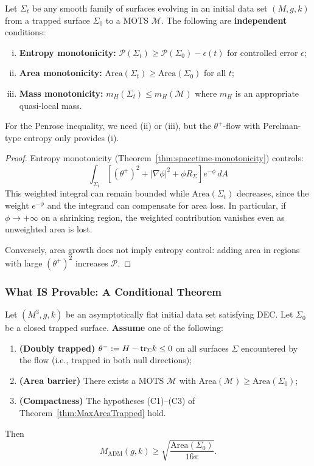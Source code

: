 \begin{proposition}
\label{prop:fundamental-gap}
Let $\Sigma_t$ be any smooth family of surfaces evolving in an initial data set $(M,g,k)$ from a trapped surface $\Sigma_0$ to a MOTS $\mathcal{M}$. The following are \textbf{independent} conditions:
\begin{enumerate}[(i)]
\item \textbf{Entropy monotonicity:} $\mathcal{P}(\Sigma_t) \geq \mathcal{P}(\Sigma_0) - \epsilon(t)$ for controlled error $\epsilon$;
\item \textbf{Area monotonicity:} $\mathrm{Area}(\Sigma_t) \geq \mathrm{Area}(\Sigma_0)$ for all $t$;
\item \textbf{Mass monotonicity:} $m_H(\Sigma_t) \leq m_H(\mathcal{M})$ where $m_H$ is an appropriate quasi-local mass.
\end{enumerate}
For the Penrose inequality, we need (ii) or (iii), but the $\theta^+$-flow with Perelman-type entropy only provides (i).
\end{proposition}

\begin{proof}
Entropy monotonicity (Theorem~\ref{thm:spacetime-monotonicity}) controls:
\[
\int_{\Sigma_t} \left[(\theta^+)^2 + |\nabla\phi|^2 + \phi R_{\Sigma}\right] e^{-\phi} \, dA
\]
This weighted integral can remain bounded while $\mathrm{Area}(\Sigma_t)$ decreases, since the weight $e^{-\phi}$ and the integrand can compensate for area loss. In particular, if $\phi \to +\infty$ on a shrinking region, the weighted contribution vanishes even as unweighted area is lost.

Conversely, area growth does not imply entropy control: adding area in regions with large $(\theta^+)^2$ increases $\mathcal{P}$.
\end{proof}

\subsubsection{What IS Provable: A Conditional Theorem}

\begin{theorem}
\label{thm:conditional-penrose}
Let $(M^3, g, k)$ be an asymptotically flat initial data set satisfying DEC. Let $\Sigma_0$ be a closed trapped surface. \textbf{Assume} one of the following:
\begin{enumerate}[\textbf{(H1)}]
\item \textbf{(Doubly trapped)} $\theta^- := H - \mathrm{tr}_\Sigma k \leq 0$ on all surfaces $\Sigma$ encountered by the flow (i.e., trapped in both null directions);
\item \textbf{(Area barrier)} There exists a MOTS $\mathcal{M}$ with $\mathrm{Area}(\mathcal{M}) \geq \mathrm{Area}(\Sigma_0)$;
\item \textbf{(Compactness)} The hypotheses (C1)--(C3) of Theorem~\ref{thm:MaxAreaTrapped} hold.
\end{enumerate}
Then
\begin{equation}
M_{\mathrm{ADM}}(g,k) \geq \sqrt{\frac{\mathrm{Area}(\Sigma_0)}{16\pi}}.
\end{equation}
\end{theorem}

